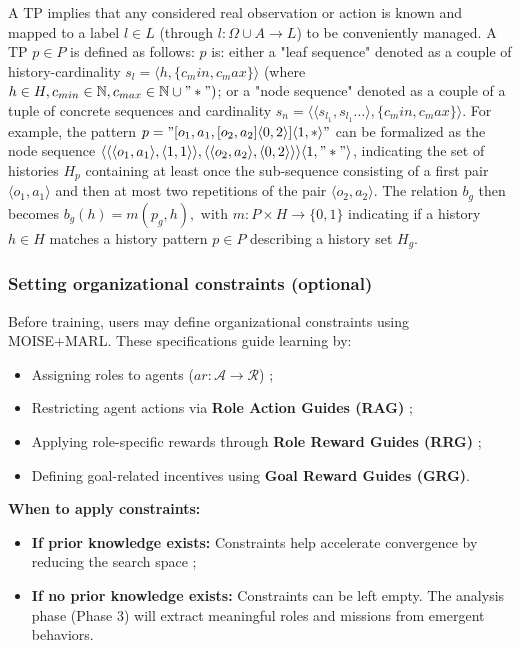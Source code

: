 \documentclass[pdflatex,sn-mathphys-num]{sn-jnl}%
\theoremstyle{thmstyleone}%
\theoremstyle{thmstyletwo}%
\theoremstyle{thmstylethree}%
\begin{document}
A TP implies that any considered real observation or action is known and mapped to a label $l \in L$ (through $l: \Omega \cup A \to L$) to be conveniently managed. A TP $p \in P$ is defined as follows: $p$ is: either a "leaf sequence" denoted as a couple of history-cardinality $s_l = \langle h, \{c_min,c_max\}\rangle$ (where $h \in H, c_{min} \in \mathbb{N}, c_{max} \in \mathbb{N} \cup "*")$; or a "node sequence" denoted as a couple of a tuple of concrete sequences and cardinality $s_n = \langle \langle s_{l_1}, s_{l_1}\dots \rangle, \{c_min,c_max\}\rangle$. For example, the pattern $p = \allowbreak "[o_1,a_1,[o_2,a_2]\langle0,2\rangle]\langle1,*\rangle"$ can be formalized as the node sequence $\allowbreak \langle \langle \langle o_1,a_1\rangle,\langle 1,1 \rangle \rangle, \langle \langle o_2,a_2 \rangle, \langle 0,2 \rangle \rangle \rangle \langle 1,"*" \rangle$, indicating the set of histories $H_p$ containing at least once the sub-sequence consisting of a first pair $\langle o_1,a_1\rangle$ and then at most two repetitions of the pair $\langle o_2,a_2 \rangle$.
The relation $b_g$ then becomes $b_g(h) = m(p_g,h), \text{ with } m: P \times H \to \{0,1\}$ indicating if a history $h \in H$ matches a history pattern $p \in P$ describing a history set $H_g$.

\subsubsection{Setting organizational constraints (optional)}
Before training, users may define organizational constraints using MOISE+MARL. These specifications guide learning by:
\begin{itemize}
    \item Assigning roles to agents ($ar: \mathcal{A} \to \mathcal{R}$) ;
    \item Restricting agent actions via \textbf{Role Action Guides (RAG)} ;
    \item Applying role-specific rewards through \textbf{Role Reward Guides (RRG)} ;
    \item Defining goal-related incentives using \textbf{Goal Reward Guides (GRG)}.
\end{itemize}

\noindent \textbf{When to apply constraints:}
\begin{itemize}
    \item \textbf{If prior knowledge exists:} Constraints help accelerate convergence by reducing the search space ;
    \item \textbf{If no prior knowledge exists:} Constraints can be left empty. The analysis phase (Phase 3) will extract meaningful roles and missions from emergent behaviors.
\end{itemize}
\end{document}
